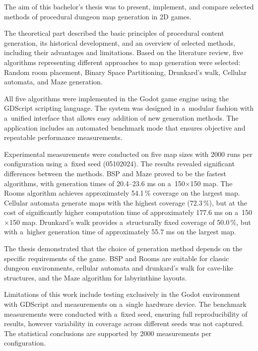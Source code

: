 \documentclass[
   program=itk,
   biblatex,
   figures=true,
   tables=true,
   glossaries,
   index
]{kidiplom}
\begin{document}
\begin{kiconclusions}[english]
The aim of this bachelor's thesis was to present, implement, and compare selected methods of procedural dungeon map generation in 2D games.

The theoretical part described the basic principles of procedural content generation, its historical development, and an overview of selected methods, including their advantages and limitations. Based on the literature review, five algorithms representing different approaches to map generation were selected: Random room placement, Binary Space Partitioning, Drunkard's walk, Cellular automata, and Maze generation.

All five algorithms were implemented in the Godot game engine using the GDScript scripting language. The system was designed in a~modular fashion with a~unified interface that allows easy addition of new generation methods. The application includes an automated benchmark mode that ensures objective and repeatable performance measurements.

Experimental measurements were conducted on five map sizes with 2000 runs per configuration using a~fixed seed (05102024). The results revealed significant differences between the methods. BSP and Maze proved to be the fastest algorithms, with generation times of 20.4--23.6 ms on a~150$\times$150 map. The Rooms algorithm achieves approximately 54.1\,\% coverage on the largest map. Cellular automata generate maps with the highest coverage (72.3\,\%), but at the cost of significantly higher computation time of approximately 177.6 ms on a~150$\times$150 map. Drunkard's walk provides a~structurally fixed coverage of 50.0\,\%, but with a~higher generation time of approximately 55.7 ms on the largest map.

The thesis demonstrated that the choice of generation method depends on the specific requirements of the game. BSP and Rooms are suitable for classic dungeon environments, cellular automata and drunkard's walk for cave-like structures, and the Maze algorithm for labyrinthine layouts.

Limitations of this work include testing exclusively in the Godot environment with GDScript and measurements on a~single hardware device. The benchmark measurements were conducted with a~fixed seed, ensuring full reproducibility of results, however variability in coverage across different seeds was not captured. The statistical conclusions are supported by 2000 measurements per configuration.
\end{kiconclusions}
\end{document}
